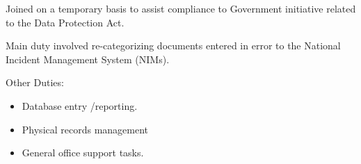 \begin{cventries}
{      \begin{cvitems} %
        \item {Joined on a temporary basis to assist compliance to Government initiative related to the Data Protection Act.}
        \item {Main duty involved re-categorizing documents entered in error to the National Incident Management System (NIMs).}
        \item {Other Duties:
        	\begin{itemize}
        		\item Database entry /reporting.
				\item Physical records management
				\item General office support tasks.
			\end{itemize}
			}
      \end{cvitems}
    }
\end{cventries}
